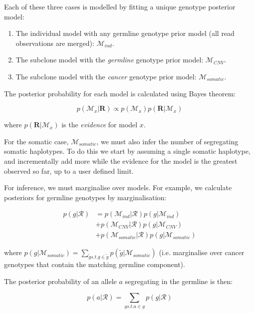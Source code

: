 \documentclass[notitlepage, twocolumn]{article}
\begin{document}
Each of these three cases is modelled by fitting a unique genotype posterior model:

\begin{enumerate}[i]
	\item The individual model with any germline genotype prior model (all read observations are merged): $\mathcal{M}_{ind}$.
	\item The subclone model with the \emph{germline} genotype prior model: $\mathcal{M}_{CNV}$.
    \item The subclone model with the \emph{cancer} genotype prior model: $\mathcal{M}_{somatic}$.
\end{enumerate}

The posterior probability for each model is calculated using Bayes theorem:

\begin{equation*}
    p(\mathcal{M}_{x} | \boldsymbol{R}) \propto p(\mathcal{M}_{x}) p(\boldsymbol{R} | \mathcal{M}_{x})  
\end{equation*}

where $p(\boldsymbol{R} | \mathcal{M}_{x})$ is the \emph{evidence} for model $x$.

For the somatic case, $\mathcal{M}_{somatic}$, we must also infer the number of segregating somatic haplotypes. To do this we start by assuming a single somatic haplotype, and incrementally add more while the evidence for the model is the greatest observed so far, up to a user defined limit.

For inference, we must marginalise over models. For example, we calculate posteriors for germline genotypes by marginalisation:

\begin{align*}
p(g | \boldsymbol{\mathcal{R}}) &= p(\mathcal{M}_{ind} | \boldsymbol{\mathcal{R}}) p(g | \mathcal{M}_{ind}) \\
&+ p(\mathcal{M}_{CNV} | \boldsymbol{\mathcal{R}}) p(g | \mathcal{M}_{CNV}) \\
&+ p(\mathcal{M}_{somatic} | \boldsymbol{\mathcal{R}}) p(g | \mathcal{M}_{somatic})
\end{align*}

\noindent where $p(g | \mathcal{M}_{somatic}) = \sum_{\tilde{g} s.t. g \in \tilde{g}} p(\tilde{g} | \mathcal{M}_{somatic})$ (i.e. marginalise over cancer genotypes that contain the matching germline component).

The posterior probability of an allele $a$ segregating in the germline is then:

\begin{equation*}
p(a | \boldsymbol{\mathcal{R}}) = \sum_{g s.t. a \in g} p(g | \boldsymbol{\mathcal{R}})
\end{equation*}
\end{document}
